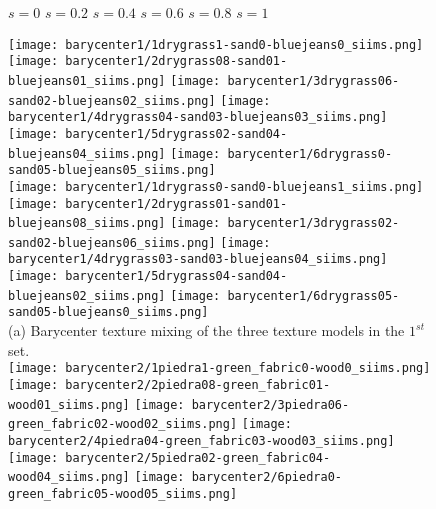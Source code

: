 \begin{figure}[ht!]
\vspace{3mm}
{\raggedright
 \hspace{0.7cm} $s=0$ \hspace{0.82cm}  $s=0.2$ \hspace{0.82cm} $s=0.4$ \hspace{0.82cm}  $s=0.6$ \hspace{0.82cm}  $s=0.8$ \hspace{0.82cm}  $s=1$\\
}
\vspace{1mm}
{\centering
    \texttt{[image: barycenter1/1drygrass1-sand0-bluejeans0\_siims.png]}
    \texttt{[image: barycenter1/2drygrass08-sand01-bluejeans01\_siims.png]}
    \texttt{[image: barycenter1/3drygrass06-sand02-bluejeans02\_siims.png]}
    \texttt{[image: barycenter1/4drygrass04-sand03-bluejeans03\_siims.png]}
    \texttt{[image: barycenter1/5drygrass02-sand04-bluejeans04\_siims.png]}
    \texttt{[image: barycenter1/6drygrass0-sand05-bluejeans05\_siims.png]} \\
\vspace{1mm}
    \texttt{[image: barycenter1/1drygrass0-sand0-bluejeans1\_siims.png]}
    \texttt{[image: barycenter1/2drygrass01-sand01-bluejeans08\_siims.png]}
    \texttt{[image: barycenter1/3drygrass02-sand02-bluejeans06\_siims.png]}
    \texttt{[image: barycenter1/4drygrass03-sand03-bluejeans04\_siims.png]}
    \texttt{[image: barycenter1/5drygrass04-sand04-bluejeans02\_siims.png]}
    \texttt{[image: barycenter1/6drygrass05-sand05-bluejeans0\_siims.png]} \\
(a) Barycenter texture mixing of the three texture models in the $1^{st}$ set. \\
\vspace{1mm}
    \texttt{[image: barycenter2/1piedra1-green\_fabric0-wood0\_siims.png]}
    \texttt{[image: barycenter2/2piedra08-green\_fabric01-wood01\_siims.png]}
    \texttt{[image: barycenter2/3piedra06-green\_fabric02-wood02\_siims.png]}
    \texttt{[image: barycenter2/4piedra04-green\_fabric03-wood03\_siims.png]}
    \texttt{[image: barycenter2/5piedra02-green\_fabric04-wood04\_siims.png]}
    \texttt{[image: barycenter2/6piedra0-green\_fabric05-wood05\_siims.png]} \\
}
\end{figure}
